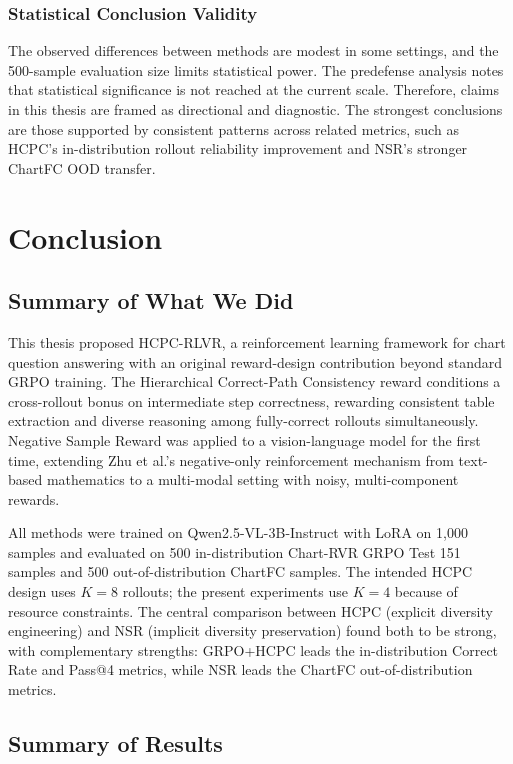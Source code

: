 \documentclass{iutbscthesis}
\begin{document}
\subsection{Statistical Conclusion Validity}

The observed differences between methods are modest in some settings, and the 500-sample evaluation size limits statistical power. The predefense analysis notes that statistical significance is not reached at the current scale. Therefore, claims in this thesis are framed as directional and diagnostic. The strongest conclusions are those supported by consistent patterns across related metrics, such as HCPC's in-distribution rollout reliability improvement and NSR's stronger ChartFC OOD transfer.


\chapter{Conclusion} \label{chapter:conclusion}

\section{Summary of What We Did}

This thesis proposed HCPC-RLVR, a reinforcement learning framework for chart question answering with an original reward-design contribution beyond standard GRPO training. The Hierarchical Correct-Path Consistency reward conditions a cross-rollout bonus on intermediate step correctness, rewarding consistent table extraction and diverse reasoning among fully-correct rollouts simultaneously. Negative Sample Reward was applied to a vision-language model for the first time, extending Zhu et al.'s negative-only reinforcement mechanism from text-based mathematics to a multi-modal setting with noisy, multi-component rewards.

All methods were trained on Qwen2.5-VL-3B-Instruct with LoRA on 1,000 samples and evaluated on 500 in-distribution Chart-RVR GRPO Test 151 samples and 500 out-of-distribution ChartFC samples. The intended HCPC design uses $K=8$ rollouts; the present experiments use $K=4$ because of resource constraints. The central comparison between HCPC (explicit diversity engineering) and NSR (implicit diversity preservation) found both to be strong, with complementary strengths: GRPO+HCPC leads the in-distribution Correct Rate and Pass@4 metrics, while NSR leads the ChartFC out-of-distribution metrics.

\section{Summary of Results}
\end{document}
